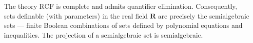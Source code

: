 The theory $\mathrm{RCF}$ is complete and admits quantifier elimination. Consequently, sets definable (with parameters) in the real field $\mathbf{R}$ are precisely the semialgebraic sets — finite Boolean combinations of sets defined by polynomial equations and inequalities. The projection of a semialgebraic set is semialgebraic.
